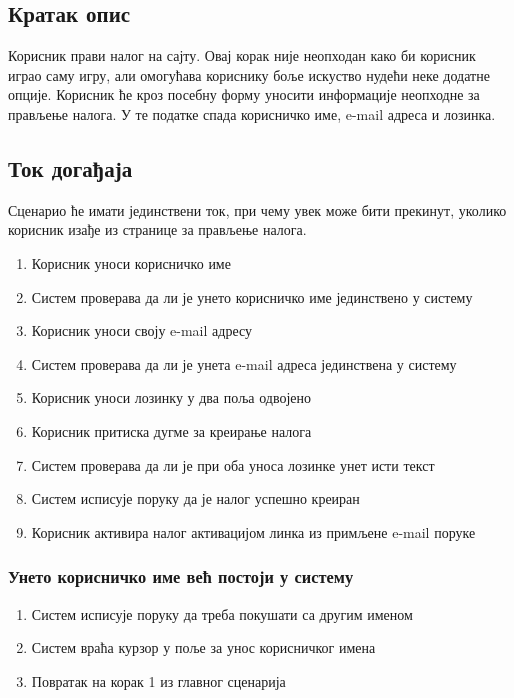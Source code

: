 \subsection{Кратак опис}
Корисник прави налог на сајту. Овај корак није неопходан како би корисник играо саму
игру, али омогућава кориснику боље искуство нудећи неке додатне опције. Корисник ће кроз
посебну форму уносити информације неопходне за прављење налога. У те податке спада
корисничко име, e-mail адреса и лозинка.

\subsection{Ток догађаја}
Сценарио ће имати јединствени ток, при чему увек може бити прекинут, уколико корисник
изађе из странице за прављење налога.

\begin{enumerate}
    \item Корисник уноси корисничко име
    \item Систем проверава да ли је унето корисничко име јединствено у систему
    \item Корисник уноси своју e-mail адресу
    \item Систем проверава да ли је унета e-mail адреса јединствена у систему
    \item Корисник уноси лозинку у два поља одвојено
    \item Корисник притиска дугме за креирање налога
    \item Систем проверава да ли је при оба уноса лозинке унет исти текст
    \item Систем исписује поруку да је налог успешно креиран
    \item Корисник активира налог активацијом линка из примљене e-mail поруке
\end{enumerate}

\subsubsection{Унето корисничко име већ постоји у систему}
\begin{enumerate}[label=2.\arabic*]
    \item Систем исписује поруку да треба покушати са другим именом
    \item Систем враћа курзор у поље за унос корисничког имена
    \item Повратак на корак 1 из главног сценарија
\end{enumerate}

